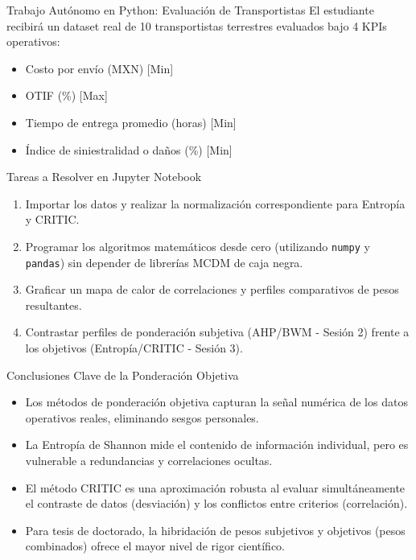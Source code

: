\documentclass[aspectratio=169, 10pt]{beamer}
\begin{document}
\begin{frame}{Trabajo Autónomo en Python: Evaluación de Transportistas}
    El estudiante recibirá un dataset real de 10 transportistas terrestres evaluados bajo 4 KPIs operativos:
    \begin{itemize}
        \item Costo por envío (MXN) [Min]
        \item OTIF (\%) [Max]
        \item Tiempo de entrega promedio (horas) [Min]
        \item Índice de siniestralidad o daños (\%) [Min]
    \end{itemize}
    \begin{block}{Tareas a Resolver en Jupyter Notebook}
        \begin{enumerate}
            \item Importar los datos y realizar la normalización correspondiente para Entropía y CRITIC.
            \item Programar los algoritmos matemáticos desde cero (utilizando \texttt{numpy} y \texttt{pandas}) sin depender de librerías MCDM de caja negra.
            \item Graficar un mapa de calor de correlaciones y perfiles comparativos de pesos resultantes.
            \item Contrastar perfiles de ponderación subjetiva (AHP/BWM - Sesión 2) frente a los objetivos (Entropía/CRITIC - Sesión 3).
        \end{enumerate}
    \end{block}
\end{frame}

\begin{frame}{Conclusiones Clave de la Ponderación Objetiva}
    \begin{itemize}
        \item Los métodos de ponderación objetiva capturan la señal numérica de los datos operativos reales, eliminando sesgos personales.
        \item La Entropía de Shannon mide el contenido de información individual, pero es vulnerable a redundancias y correlaciones ocultas.
        \item El método CRITIC es una aproximación robusta al evaluar simultáneamente el contraste de datos (desviación) y los conflictos entre criterios (correlación).
        \item Para tesis de doctorado, la hibridación de pesos subjetivos y objetivos (pesos combinados) ofrece el mayor nivel de rigor científico.
    \end{itemize}
\end{frame}
\end{document}

